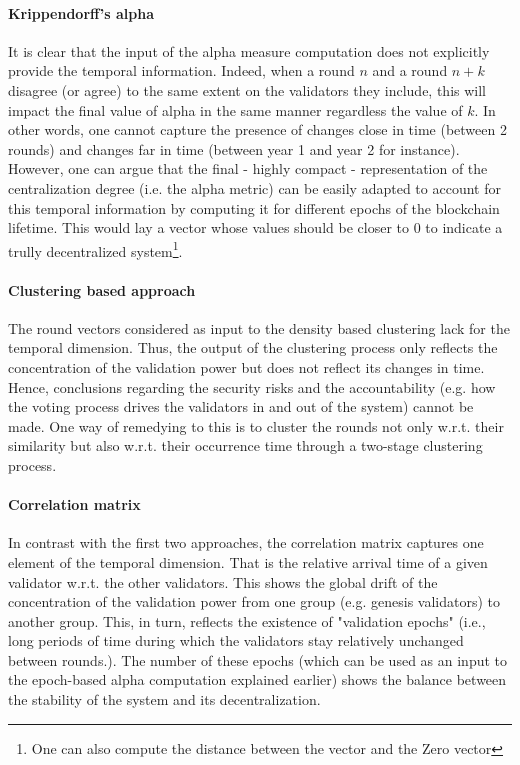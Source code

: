 \documentclass{article}
\begin{document}
\paragraph{Krippendorff's alpha} It is clear that the input of the alpha measure computation does not explicitly provide the temporal information. Indeed, when a round $n$ and a round $n + k$ disagree (or agree) to the same extent on the validators they include, this will impact the final value of alpha in the same manner regardless the value of $k$. In other words, one cannot capture the presence of changes close in time (between 2 rounds) and changes far in time (between year 1 and year 2 for instance). However, one can argue that the final - highly compact - representation of the centralization degree (i.e. the alpha metric) can be easily adapted to account for this temporal information by computing it for different epochs of the blockchain lifetime. This would lay a vector whose values should be closer to 0 to indicate a trully decentralized system\footnote{One can also compute the distance between the vector and the Zero vector}.

\paragraph{Clustering based approach} The round vectors considered as input to the density based clustering lack for the temporal dimension. Thus, the output of the clustering process only reflects the concentration of the validation power but does not reflect its changes in time. Hence, conclusions regarding the security risks and the accountability (e.g. how the voting process drives the validators in and out of the system) cannot be made. One way of remedying to this is to cluster the rounds not only w.r.t. their similarity but also w.r.t. their occurrence time through a two-stage clustering process.

\paragraph{Correlation matrix} In contrast with the first two approaches, the correlation matrix captures one element of the temporal dimension. That is the relative arrival time of a given validator w.r.t. the other validators. This shows the global drift of the concentration of the validation power from one group (e.g. genesis validators) to another group. This, in turn, reflects the existence of "validation epochs" (i.e., long periods of time during which the validators stay relatively unchanged between rounds.). The number of these epochs (which can be used as an input to the epoch-based alpha computation explained earlier) shows the balance between the stability of the system and its decentralization.
\end{document}

